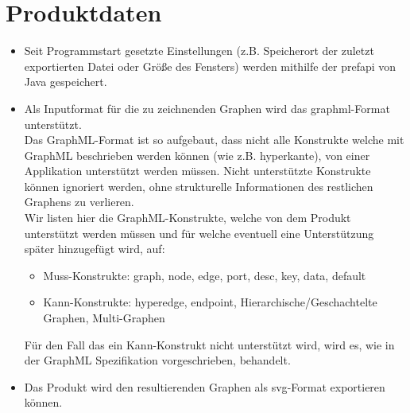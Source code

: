 \chapter{Produktdaten}

\begin{itemize}
  \item Seit Programmstart gesetzte Einstellungen (z.B. Speicherort der zuletzt exportierten Datei oder Größe des Fensters) werden mithilfe der \gls{prefapi} von Java gespeichert.
  \item Als Inputformat für die zu zeichnenden Graphen wird das \gls{graphml}-Format unterstützt.\\
    Das GraphML-Format ist so aufgebaut, dass nicht alle Konstrukte welche mit GraphML beschrieben werden können (wie z.B. \gls{hyperkante}),
    von einer Applikation unterstützt werden müssen.
    Nicht unterstützte Konstrukte können ignoriert werden, ohne strukturelle Informationen des restlichen Graphens zu verlieren.\\
    Wir listen hier die GraphML-Konstrukte, welche von dem Produkt unterstützt werden müssen und für welche eventuell eine Unterstützung später hinzugefügt wird, auf:
    \begin{itemize}
      \item Muss-Konstrukte: graph, node, edge, port, desc, key, data, default %
      \item Kann-Konstrukte: hyperedge, endpoint, Hierarchische/Geschachtelte Graphen,  Multi-Graphen
    \end{itemize}
    Für den Fall das ein Kann-Konstrukt nicht unterstützt wird, wird es, wie in der GraphML Spezifikation vorgeschrieben, behandelt.
  \item Das Produkt wird den resultierenden Graphen als \gls{svg}-Format exportieren können.
\end{itemize}